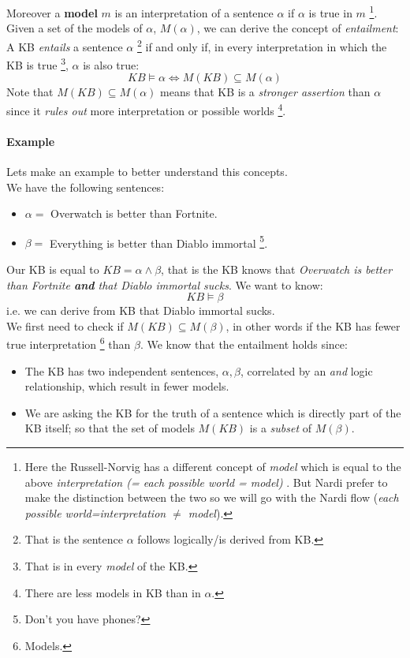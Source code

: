 \documentclass[10pt,a4paper]{article}
\begin{document}
Moreover a \textbf{model} $m$ is an interpretation of a sentence $\alpha$ if $\alpha$ is true in $m$ \footnote{Here the Russell-Norvig has a different concept of \textit{model} which is equal to the above \textit{interpretation (= each possible world = model)} . But Nardi prefer to make the distinction between the two so we will go with the Nardi flow (\textit{each possible world=interpretation $\neq$ model}).}. Given a set of the models of $\alpha$, $M(\alpha)$, we can derive the concept of \textit{entailment}:\\
A KB \textit{entails} a sentence $\alpha$ \footnote{That is the sentence $\alpha$ follows logically/is derived from KB.} if and only if, in every interpretation in which the KB is true \footnote{That is in every \textit{model} of the KB.}, $\alpha$ is also true:
\[KB \models \alpha \Leftrightarrow M(KB) \subseteq M(\alpha)\]
Note that $ M(KB) \subseteq M(\alpha)$ means that KB is a \textit{stronger assertion} than $\alpha$ since it \textit{rules out} more interpretation or possible worlds \footnote{There are less models in KB than in $\alpha$.}.

\paragraph{Example} Lets make an example to better understand this concepts.\\
We have the following sentences: 
\begin{itemize}
\item $\alpha=$ Overwatch is better than Fortnite.
\item $\beta=$ Everything is better than Diablo immortal \footnote{Don't you have phones?}.
\end{itemize}
Our KB is equal to $KB=\alpha \wedge \beta$, that is the KB knows that \textit{Overwatch is better than Fortnite \textbf{and} that Diablo immortal sucks}. We want to know:
\[KB \models \beta\]
i.e. we can derive from KB that Diablo immortal sucks.\\
We first need to check if $M(KB) \subseteq M(\beta)$, in other words if the KB has fewer true interpretation \footnote{Models.} than $\beta$. We know that the entailment holds since:
\begin{itemize}
\item The KB has two independent sentences, $\alpha,\beta$, correlated by an \textit{and} logic relationship, which result in fewer models.
\item  We are asking the KB for the truth of a sentence which is directly part of the KB itself; so that the set of models $M(KB)$ is a \textit{subset} of $M(\beta)$.
\end{itemize}
\end{document}
